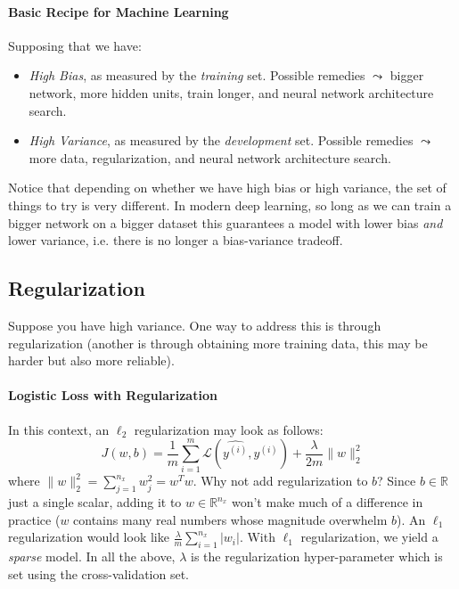 \documentclass[12pt]{article}
\begin{document}
\paragraph{Basic Recipe for Machine Learning}
Supposing that we have:
\begin{itemize}   \item \emph{High Bias}, as measured by the \emph{training} set. Possible remedies $\leadsto$ bigger network, more hidden units, train longer, and neural network architecture search.
  \item \emph{High Variance}, as measured by the \emph{development} set. Possible remedies $\leadsto$ more data, regularization, and neural network architecture search. \end{itemize}
Notice that depending on whether we have high bias or high variance, the set of things to try is very different. In modern deep learning, so long as we can train a bigger network on a bigger dataset this guarantees a model with lower bias \emph{and} lower variance, i.e. there is no longer a bias-variance tradeoff.

\subsection{Regularization} 
Suppose you have high variance. One way to address this is through regularization (another is through obtaining more training data, this may be harder but also more reliable). 
\paragraph{Logistic Loss with Regularization}
In this context, an $\ell_2$ regularization may look as follows:
\[
  J(w,b) = \frac{1}{m} \sum_{i=1}^m \mathcal L \left(\hat {y^{(i)}}, y^{(i)}\right) + \frac{\lambda}{2m} \|w\|_2^2
\]
where $\|w\|_2^2 = \sum_{j=1}^{n_x} w_j^2 = w^Tw$. Why not add regularization to $b$? Since $b \in \mathbb R$ just a single scalar, adding it to $w \in \mathbb R^{n_x}$ won't make much of a difference in practice ($w$ contains many real numbers whose magnitude overwhelm $b$). An $\ell_1$ regularization would look like $\frac{\lambda}{m} \sum_{i=1}^{n_x} |w_i|$. With $\ell_1$ regularization, we yield a \emph{sparse} model.
In all the above, $\lambda$ is the regularization hyper-parameter which is set using the cross-validation set.
\end{document}
